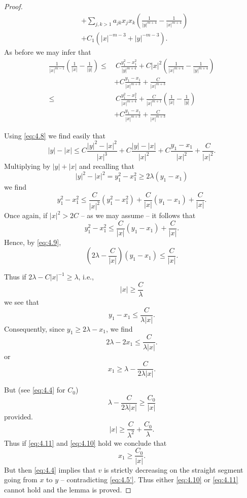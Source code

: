 \begin{proof}
\[\begin{aligned}
		&+ \sum_{j,k>1} a_{jk} x_j x_k \left( \frac{1}{|y|^{m+4}} - \frac{1}{|x|^{m+4}} \right)\\
		&+ C_1 (|x|^{-m-3} + |y|^{-m-3}).
	\end{aligned}\]
	As before we may infer that
	\[\begin{aligned}
		\frac{1}{|x|^{m-1}} \left(\frac{1}{|x|} - \frac{1}{|y|}\right) \leq &\ C \frac{y_1^2-x_1^2}{|y|^{m+4}} + C|x|^2 \left( \frac{1}{|x|^{m+4}} - \frac{1}{|y|^{m+4}} \right)\\
		&+ C\frac{y_1-x_1}{|x|^{m+3}} + \frac{C}{|x|^{m+3}}\\
		\leq &\ C \frac{y_1^2-x_1^2}{|x|^{m+4}} + \frac{C}{|x|^{m+1}}\left(\frac{1}{|x|}-\frac{1}{|y|}\right)\\
		&+ C\frac{y_1-x_1}{|x|^{m+3}} + \frac{C}{|x|^{m+3}}
	\end{aligned}\]
	
	Using \eqref{eq:4.8} we find easily that
	\[ |y|-|x|\leq  C\frac{|y|^2-|x|^2}{|x|^3} + C\frac{|y|-|x|}{|x|^2} 
    + C\frac{y_1-x_1}{|x|^2} + \frac{C}{|x|^2}. \]
	Multiplying by $|y|+|x|$ and recalling that
	\begin{equation}\label{eq:4.9}
		|y|^2-|x|^2 = y_1^2-x_1^2 \geq  2\lambda(y_1-x_1)
	\end{equation}
	we find
	\[ y_1^2-x_1^2 \leq  \frac{C}{|x|^2} (y_1^2-x_1^2) + \frac{C}{|x|} (y_1-x_1) + \frac{C}{|x|} .\]
	Once again, if $|x|^2> 2C$ -- as we may assume -- it follows that
	\[ y_1^2-x_1^2 \leq  \frac{C}{|x|} (y_1-x_1) + \frac{C}{|x|}. \]
	Hence, by \eqref{eq:4.9},
	\[\left(2\lambda-\frac{C}{|x|}\right)(y_1-x_1) \leq  \frac{C}{|x|}.  \]

	Thus if $2\lambda-C|x|^{-1}\geq \lambda$, i.e.,
	\begin{equation}\label{eq:4.10}
		|x|\geq \frac{C}{\lambda}
	\end{equation}
	we see that
	\[y_1-x_1\leq \frac{C}{\lambda|x|}. \]
	Consequently, since $y_1\geq 2\lambda-x_1$, we find
	\[2\lambda-2x_1\leq \frac{C}{\lambda|x|}. \]
	or
	\[x_1\geq \lambda-\frac{C}{2\lambda|x|}.\]
	
	But (see \eqref{eq:4.4} for $C_0$)
	\[\lambda-\frac{C}{2\lambda|x|}\geq  \frac{C_0}{|x|}\]
	provided.
	\begin{equation}\label{eq:4.11}
		|x|\geq  \frac{C}{\lambda^2} + \frac{C_0}{\lambda}.
	\end{equation}
	Thus if \eqref{eq:4.11} and \eqref{eq:4.10} hold we conclude that
	\[x_1\geq \frac{C_0}{|x|}.\]
	But then \eqref{eq:4.4} implies that $v$ is strictly decreasing on the straight segment going from $x$ to $y$ -- contradicting \eqref{eq:4.5'}. Thus either \eqref{eq:4.10} or \eqref{eq:4.11} cannot hold and the lemma is proved.
\end{proof}

